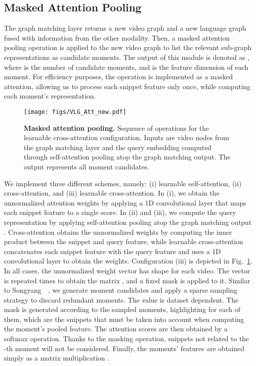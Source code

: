 \documentclass[10pt,twocolumn,letterpaper]{article}
\begin{document}
\subsection{Masked Attention Pooling}\label{subsec: Pool}
The graph matching layer returns a new video graph and a new language graph fused with information from the other modality. Then, a masked attention pooling operation is applied to the new video graph to list the relevant sub-graph representations as candidate moments. The output of this module is denoted as , where  is the number of candidate moments, and  is the feature dimension of each moment. For efficiency purposes, the operation is implemented as a masked attention, allowing us to process each snippet feature only once, while computing each moment's representation.

\begin{figure}[!t]
\centering
    \texttt{[image: figs/VLG\_Att\_new.pdf]}
    \caption{\textbf{Masked attention pooling.} Sequence of operations for the learnable cross-attention configuration. Inputs are video nodes  from the graph matching layer and the query embedding  computed through self-attention pooling atop the graph matching output. The output  represents all moment candidates.}
    \label{fig:att}
    \vspace{-0.2cm}
\end{figure}

We implement three different schemes, namely: (i) learnable self-attention, (ii) cross-attention, and (iii) learnable cross-attention. In (i), we obtain the unnormalized attention weights by applying a 1D convolutional layer that maps each snippet feature to a single score. In (ii) and (iii), we compute the query representation  by applying self-attention pooling atop the graph matching output . Cross-attention obtains the unnormalized weights by computing the inner product between the snippet and query feature, while learnable cross-attention concatenates each snippet feature with the query feature and uses a 1D convolutional layer to obtain the weights. Configuration (iii) is depicted in Fig.~\ref{fig:att}.  In all cases, the unnormalized weight vector has shape  for each video. The vector is repeated  times to obtain the matrix , and a fixed mask  is applied to it. Similar to  Songyang~\etal~\cite{2DTAN_2020_AAAI}, we generate  moment candidates and apply a sparse sampling strategy to discard redundant moments. The value  is dataset dependent. 
The mask is generated according to the sampled moments, highlighting for each of them, which are the snippets that must be taken into account when computing the moment's pooled feature. 
The attention scores are then obtained by a softmax operation. Thanks to the masking operation, snippets not related to the -th moment will not be considered. Finally, the moments' features are obtained simply as a matrix multiplication . 
\end{document}
